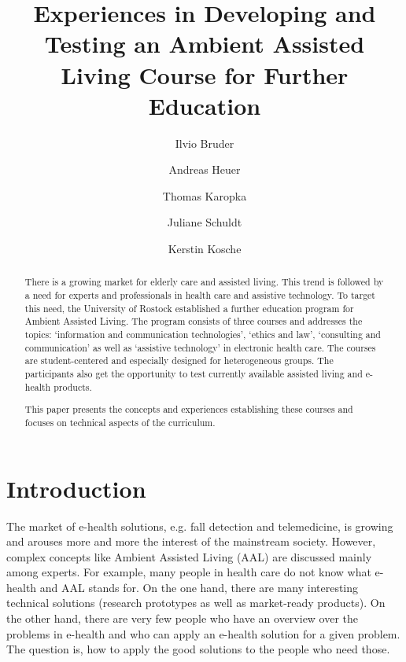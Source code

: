 \documentclass[runningheads,a4paper]{llncs}
\begin{document}
\mainmatter  %

\title{
	Experiences in Developing and Testing an Ambient Assisted Living Course for Further Education
}
% 

\author{
	Ilvio Bruder \and
	Andreas Heuer \and
	Thomas Karopka \and
	Juliane Schuldt \and
	Kerstin Kosche
}


\maketitle


\begin{abstract}
There is a growing market for elderly care and assisted living. This trend is followed by a need for experts and professionals in health care and assistive technology. To target this need, the University of Rostock established a further education program for Ambient Assisted Living. The program consists of three courses and addresses the topics: `information and communication technologies', `ethics and law', `consulting and communication' as well as `assistive technology' in electronic health care. The courses are student-centered and especially designed for heterogeneous groups. The participants also get the opportunity to test currently available assisted living and e-health products.

This paper presents the concepts and experiences establishing these courses and focuses on technical aspects of the curriculum.
\end{abstract}

\section{Introduction}\label{sec:intro}
The market of e-health solutions, e.g. fall detection and telemedicine, is growing and arouses more and more the interest of the mainstream society. However, complex concepts like Ambient Assisted Living (AAL) are discussed mainly among experts. For example, many people in health care do not know what e-health and AAL stands for. On the one hand, there are many interesting technical solutions (research prototypes as well as market-ready products). On the other hand, there are very few people who have an overview over the problems in e-health and who can apply an e-health solution for a given problem. The question is, how to apply the good solutions to the people who need those.
\end{document}
